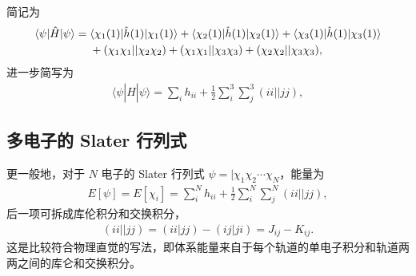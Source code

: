 简记为
\begin{align}
    \langle \psi | \hat H | \psi \rangle ={}& 
    \langle \chi_1(1) | \hat h(1) | \chi_1(1) \rangle + 
    \langle \chi_2(1) | \hat h(1) | \chi_2(1) \rangle + 
    \langle \chi_3(1) | \hat h(1) | \chi_3(1) \rangle  \notag \\
    &{}+(\chi_1\chi_1||\chi_2\chi_2) + (\chi_1\chi_1||\chi_3\chi_3) + (\chi_2\chi_2||\chi_3\chi_3),
\end{align}
进一步简写为
\begin{align}
    \langle \psi | \hat H | \psi \rangle = \sum_i h_{ii} 
    + \frac12 \sum_i^3 \sum_j^3 (ii||jj),
\end{align}

\subsection{多电子的 Slater 行列式}
更一般地，对于 $N$ 电子的 Slater 行列式 $\psi = |\chi_1\chi_2\cdots \chi_N$，能量为
\begin{align}
    E[\psi] = E[{\chi_i}] = 
    \sum_i^N h_{ii}
    + \frac12 \sum_i^N \sum_j^N (ii||jj), 
    \label{eq:NSlater_det}
\end{align}
后一项可拆成库伦积分和交换积分，
\begin{align}
    (ii||jj) = (ii|jj) - (ij|ji) = J_{ij} - K_{ij}. 
\end{align}
这是比较符合物理直觉的写法，即体系能量来自于每个轨道的单电子积分和轨道两两之间的库仑和交换积分。


